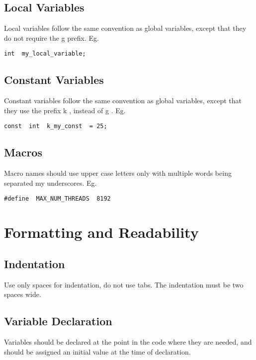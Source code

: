 \subsection{Local Variables}

Local variables follow the same convention as global variables, except
that they do not require the g prefix.  Eg.

\begin{Verbatim}
int  my_local_variable;
\end{Verbatim}


\subsection{Constant  Variables}

Constant variables follow the same convention as global variables,
except that they use the prefix k , instead of g .  Eg.

\begin{Verbatim}
const  int  k_my_const  = 25;
\end{Verbatim}


\subsection{Macros}

Macro names should use upper case letters only with multiple words
being separated my underscores. Eg.

\begin{Verbatim}
#define  MAX_NUM_THREADS  8192
\end{Verbatim}




\section{Formatting and Readability}

\subsection{Indentation}

Use only spaces for indentation, do not use tabs.  The indentation
must be two spaces wide.


\subsection{Variable Declaration}

Variables should be declared at the point in the code where they are
needed, and should be assigned an initial value at the time of
declaration.


